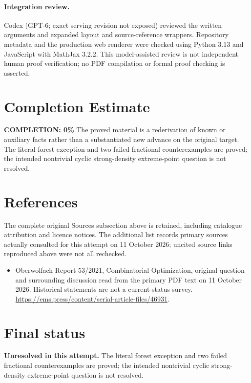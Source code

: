 \documentclass[11pt]{article}
\begin{document}
\paragraph{Integration review.} Codex (GPT-6; exact serving revision not exposed) reviewed the written arguments and expanded layout and source-reference wrappers. Repository metadata and the production web renderer were checked using Python 3.13 and JavaScript with MathJax 3.2.2. This model-assisted review is not independent human proof verification; no PDF compilation or formal proof checking is asserted.

\section{Completion Estimate}
\noindent\textbf{COMPLETION: 0\%}
The proved material is a rederivation of known or auxiliary facts rather than a substantiated new advance on the original target. The literal forest exception and two failed fractional counterexamples are proved; the intended nontrivial cyclic strong-density extreme-point question is not resolved.
\section{References}
The complete original Sources subsection above is retained, including catalogue attribution and licence notices. The additional list records primary sources actually consulted for this attempt on 11 October 2026; uncited source links reproduced above were not all rechecked.
\begin{itemize}
\item Oberwolfach Report 53/2021, Combinatorial Optimization, original question and surrounding discussion read from the primary PDF text on 11 October 2026. Historical statements are not a current-status survey. \url{https://ems.press/content/serial-article-files/46931}.
\end{itemize}
\section{Final status}
\textbf{Unresolved in this attempt.} The literal forest exception and two failed fractional counterexamples are proved; the intended nontrivial cyclic strong-density extreme-point question is not resolved.
\end{document}
